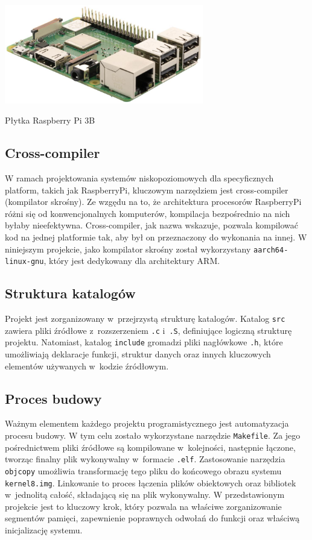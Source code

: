 \documentclass[shortabstract]{iithesis}
\begin{document}
\begingroup
\centering
\includegraphics[width=0.65\textwidth]{rpi3b.jpg}
\captionsetup{type=figure}
\caption{Płytka Raspberry Pi 3B}
\endgroup
\subsection{Cross-compiler}
W ramach projektowania systemów niskopoziomowych dla specyficznych platform, takich jak RaspberryPi, kluczowym narzędziem jest cross-compiler (kompilator skrośny). Ze wzgędu na to, że architektura procesorów RaspberryPi różni się od konwencjonalnych komputerów, kompilacja bezpośrednio na nich byłaby nieefektywna. Cross-compiler, jak nazwa wskazuje, pozwala kompilować kod na jednej platformie tak, aby był on przeznaczony do wykonania na innej. W niniejszym projekcie, jako kompilator skrośny został wykorzystany \texttt{aarch64-linux-gnu}, który jest dedykowany dla architektury ARM.
\subsection{Struktura katalogów}
Projekt jest zorganizowany w~przejrzystą strukturę katalogów. Katalog \texttt{src} zawiera pliki źródłowe z~rozszerzeniem \texttt{.c} i~\texttt{.S}, definiujące logiczną strukturę projektu. Natomiast, katalog \texttt{include} gromadzi pliki nagłówkowe \texttt{.h}, które umożliwiają deklaracje funkcji, struktur danych oraz innych kluczowych elementów używanych w~kodzie źródłowym.
\subsection{Proces budowy}
Ważnym elementem każdego projektu programistycznego jest automatyzacja procesu budowy. W tym celu zostało wykorzystane narzędzie \texttt{Makefile}. Za jego pośrednictwem pliki źródłowe są kompilowane w~kolejności, następnie łączone, tworząc finalny plik wykonywalny w~formacie \texttt{.elf}. Zastosowanie narzędzia \texttt{objcopy} umożliwia transformację tego pliku do końcowego obrazu systemu \texttt{kernel8.img}.
Linkowanie to proces łączenia plików obiektowych oraz bibliotek w~jednolitą całość, składającą się na plik wykonywalny. W przedstawionym projekcie jest to kluczowy krok, który pozwala na właściwe zorganizowanie segmentów pamięci, zapewnienie poprawnych odwołań do funkcji oraz właściwą inicjalizację systemu.
\end{document}
